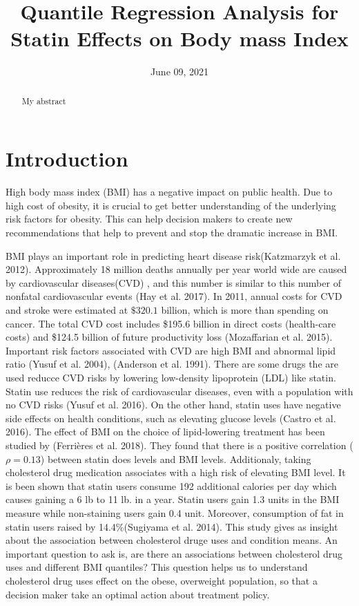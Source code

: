 \documentclass[
  12pt,
]{article}
\title{Quantile Regression Analysis for Statin Effects on Body mass Index}
\author{}
\date{\vspace{-2.5em}June 09, 2021}
\begin{document}
\maketitle
\begin{abstract}
My abstract
\end{abstract}

{
\setcounter{tocdepth}{2}
\tableofcontents
}
\section{Introduction}

High body mass index (BMI) has a negative impact on public health. Due to high cost of obesity, it is crucial to get better understanding of the underlying risk factors for obesity. This can help decision makers to create new recommendations that help to prevent and stop the dramatic increase in BMI.

BMI plays an important role in predicting heart disease risk(Katzmarzyk et al. 2012). Approximately 18 million deaths annually per year world wide are caused by cardiovascular diseases(CVD) , and this number is similar to this number of nonfatal cardiovascular events (Hay et al. 2017).
In 2011, annual costs for CVD and stroke were estimated at \(\$320.1\) billion, which is more than spending on cancer. The total CVD cost includes \$195.6 billion in direct costs (health-care costs) and \$124.5 billion of future productivity loss (Mozaffarian et al. 2015). Important risk factors associated with CVD are high BMI and abnormal lipid ratio (Yusuf et al. 2004), (Anderson et al. 1991). There are some drugs the are used reducce CVD risks by lowering low-density lipoprotein (LDL) like statin. Statin use reduces the risk of cardiovascular diseases, even with a population with no CVD risks (Yusuf et al. 2016). On the other hand, statin uses have negative side effects on health conditions, such as elevating glucose levels (Castro et al. 2016). The effect of BMI on the choice of lipid-lowering treatment has been studied by (Ferrières et al. 2018). They found that there is a positive correlation (\(\rho=0.13\)) between statin does levels and BMI levels.
Additionaly, taking cholesterol drug medication associates with a high risk of elevating BMI level. It is been shown that statin users consume 192 additional calories per day which causes gaining a 6 lb to 11 lb. in a year. Statin users gain 1.3 units in the BMI measure while non-staining users gain 0.4 unit. Moreover, consumption of fat in statin users raised by 14.4\%(Sugiyama et al. 2014). This study gives as insight about the association between cholesterol druge uses and condition means. An important question to ask is, are there an associations between cholesterol drug uses and different BMI quantiles? This question helps us to understand cholesterol drug uses effect on the obese, overweight population, so that a decision maker take an optimal action about treatment policy.
\end{document}
